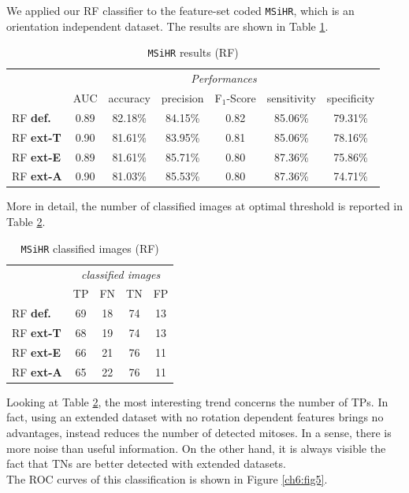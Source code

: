 We applied our \Gls{RF} classifier to the feature-set coded \texttt{MSiHR}, which is an orientation independent dataset. The results are shown in Table \ref{ch6:tab7}.


\begin{table}[!hbt]
\small
 \centering
 \begin{tabular}{lcccccc}
  \toprule
  & \multicolumn{6}{c}{\textit{Performances}} \\
  \cmidrule(lr){2-7}
  & AUC  & accuracy & precision & F$_1$-Score & sensitivity & specificity \\
  \midrule
    RF \textbf{def.}      & 0.89 & 82.18\% & 84.15\% & 0.82 & 85.06\% & 79.31\%  \\
    RF \textbf{ext-T}     & 0.90 & 81.61\% & 83.95\% & 0.81 & 85.06\% & 78.16\%  \\
    RF \textbf{ext-E}     & 0.89 & 81.61\% & 85.71\% & 0.80 & 87.36\% & 75.86\%  \\
    RF \textbf{ext-A}     & 0.90 & 81.03\% & 85.53\% & 0.80 & 87.36\% & 74.71\% \\
    \bottomrule
 \end{tabular}
 \caption{\texttt{MSiHR} results (RF)}
 \label{ch6:tab7}
\end{table}
  
  
More in detail, the number of classified images at optimal threshold is reported in Table \ref{ch6:tab8}.


\begin{table}[!hbt]
\small
 \centering
 \begin{tabular}{lcccc}
  \toprule
  & \multicolumn{4}{c}{\textit{classified images}} \\
  \cmidrule(lr){2-5}
   & TP  & FN & TN & FP  \\
   \midrule
    RF \textbf{def.}      & 69 & 18 & 74 & 13  \\
    RF \textbf{ext-T}     & 68 & 19 & 74 & 13  \\
    RF \textbf{ext-E}     & 66 & 21 & 76 & 11  \\
    RF \textbf{ext-A}     & 65 & 22 & 76 & 11 \\
    \bottomrule
 \end{tabular}
 \caption{\texttt{MSiHR} classified images (RF)}
 \label{ch6:tab8}
\end{table}  

Looking at Table \ref{ch6:tab8}, the most interesting trend concerns the number of \Glspl{TP}. In fact, using an extended dataset with no rotation dependent features
brings no advantages, instead reduces the number of detected mitoses. In a sense, there is more noise than useful information. On the other hand, it is always visible 
the fact that \Glspl{TN} are better detected with extended datasets.\\
The \Gls{ROC} curves of this classification is shown in Figure \ref{ch6:fig5}.

